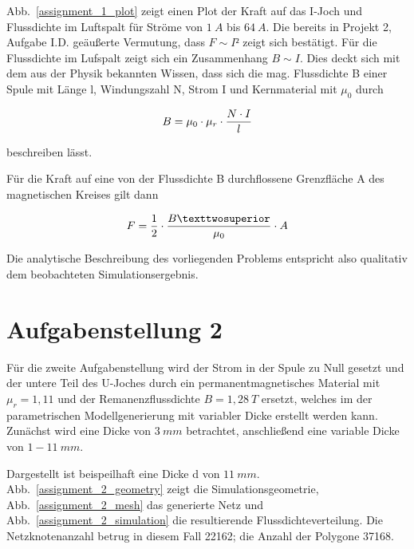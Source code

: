 \documentclass[conference,a4paper,twoside]{IEEEtran}
\begin{document}
Abb.~\ref{assignment_1_plot} zeigt einen Plot der Kraft auf das I-Joch und Flussdichte im Luftspalt für Ströme von $1\ A$ bis $64\ A$. Die bereits in Projekt 2, Aufgabe I.D. geäußerte Vermutung, dass $F \sim I²$ zeigt sich bestätigt. Für die Flussdichte im Lufspalt zeigt sich ein Zusammenhang $B \sim I$. Dies deckt sich mit dem aus der Physik bekannten Wissen, dass sich die mag. Flussdichte B einer Spule mit Länge l, Windungszahl N, Strom I und Kernmaterial mit $\mu_0$ durch

\begin{equation}
B = \mu_0 \cdot \mu_r \cdot {N \cdot I \over l}
\label{eq_magnetic_field_coil}
\end{equation}

beschreiben lässt.

Für die Kraft auf eine von der Flussdichte B durchflossene Grenzfläche A des magnetischen Kreises gilt dann

\begin{equation}
F = {1 \over 2} \cdot {B² \over \mu_0} \cdot A
\label{eq_electromagnetic_force}
\end{equation}

Die analytische Beschreibung des vorliegenden Problems entspricht also qualitativ dem beobachteten Simulationsergebnis.

\section{Aufgabenstellung 2}

Für die zweite Aufgabenstellung wird der Strom in der Spule zu Null gesetzt und der untere Teil des U-Joches durch ein permanentmagnetisches Material mit $\mu_r = 1,11$ und der Remanenzflussdichte $B = 1,28\ T$ ersetzt, welches im der parametrischen Modellgenerierung mit variabler Dicke erstellt werden kann. Zunächst wird eine Dicke von $3\ mm$ betrachtet, anschließend eine variable Dicke von $1 - 11\ mm$.

Dargestellt ist beispeilhaft eine Dicke d von $11\ mm$. Abb.~\ref{assignment_2_geometry} zeigt die Simulationsgeometrie, Abb.~\ref{assignment_2_mesh} das generierte Netz und Abb.~\ref{assignment_2_simulation} die resultierende Flussdichteverteilung. Die Netzknotenanzahl betrug in diesem Fall 22162; die Anzahl der Polygone 37168.
\end{document}
